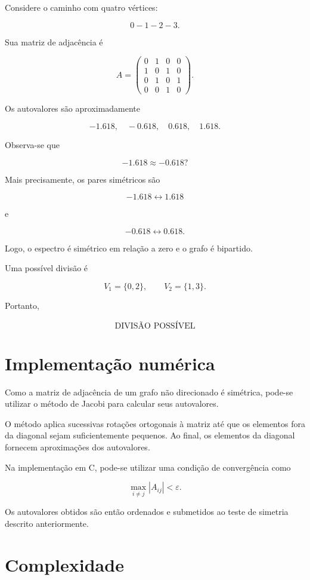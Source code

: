 \documentclass[12pt,a4paper]{article}
\begin{document}
Considere o caminho com quatro vértices:

$$
0-1-2-3.
$$

Sua matriz de adjacência é

$$
A=
\begin{pmatrix}
0&1&0&0\\
1&0&1&0\\
0&1&0&1\\
0&0&1&0
\end{pmatrix}.
$$

Os autovalores são aproximadamente

$$
-1.618,\quad
-0.618,\quad
0.618,\quad
1.618.
$$

Observa-se que

$$
-1.618\approx -0.618? 
$$

Mais precisamente, os pares simétricos são

$$
-1.618\leftrightarrow1.618
$$

e

$$
-0.618\leftrightarrow0.618.
$$

Logo, o espectro é simétrico em relação a zero e o grafo é bipartido.

Uma possível divisão é

$$
V_1=\{0,2\},
\qquad
V_2=\{1,3\}.
$$

Portanto,

$$
\boxed{\text{DIVISÃO POSSÍVEL}}
$$

\section{Implementação numérica}

Como a matriz de adjacência de um grafo não direcionado é simétrica,
pode-se utilizar o método de Jacobi para calcular seus autovalores.

O método aplica sucessivas rotações ortogonais à matriz até que os
elementos fora da diagonal sejam suficientemente pequenos. Ao final,
os elementos da diagonal fornecem aproximações dos autovalores.

Na implementação em C, pode-se utilizar uma condição de convergência
como

$$
\max_{i\neq j}|A_{ij}|<\varepsilon.
$$

Os autovalores obtidos são então ordenados e submetidos ao teste de
simetria descrito anteriormente.

\section{Complexidade}
\end{document}
